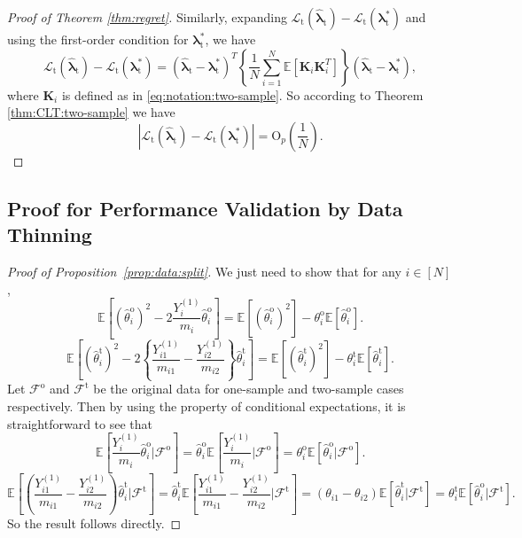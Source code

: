 \documentclass[12pt,letterpaper]{article}
\begin{document}
\begin{proof}[Proof of Theorem \ref{thm:regret}]
Similarly, expanding $\mathcal{L}_{\mathrm{t}}(\hat{\boldsymbol{\lambda}}_{\mathrm{t}})-\mathcal{L}_{\mathrm{t}}(\boldsymbol{\lambda}_{\mathrm{t}}^*)$ and using the first-order condition for $\boldsymbol{\lambda}_{\mathrm{t}}^*$, we have  
\begin{equation}\label{eq:loss:regret:two-sample}
\mathcal{L}_{\mathrm{t}}(\hat{\boldsymbol{\lambda}}_{\mathrm{t}})-\mathcal{L}_{\mathrm{t}}(\boldsymbol{\lambda}_{\mathrm{t}}^*)=(\hat{\boldsymbol{\lambda}}_{\mathrm{t}}-\boldsymbol{\lambda}_{\mathrm{t}}^*)^T\left\{\frac{1}{N}\sum_{i=1}^N\mathbb{E}\left[\mathbf{K}_i\mathbf{K}_i^T\right]\right\}(\hat{\boldsymbol{\lambda}}_{\mathrm{t}}-\boldsymbol{\lambda}_{\mathrm{t}}^*),
\end{equation}
where $\mathbf{K}_i$ is defined as in \eqref{eq:notation:two-sample}. So according to Theorem \ref{thm:CLT:two-sample} we have 
$$\left|\mathcal{L}_{\mathrm{t}}(\hat{\boldsymbol{\lambda}}_{\mathrm{t}})-\mathcal{L}_{\mathrm{t}}(\boldsymbol{\lambda}_{\mathrm{t}}^*)\right|=\mathrm{O}_{p}\left(\frac{1}{N}\right).$$
\end{proof}

\subsection{Proof for Performance Validation by Data Thinning}
\begin{proof}[Proof of Proposition~\ref{prop:data:split}]
We just need to show that for any $i\in[N]$, 
$$\mathbb{E}\left[\left(\hat{\theta}_i^{\mathrm{o}}\right)^2-2\frac{Y_i^{(1)}}{m_i}\hat{\theta}_i^{\mathrm{o}}\right]=\mathbb{E}\left[\left(\hat{\theta}_i^{\mathrm{o}}\right)^2\right]-\theta_i^{\mathrm{o}}\mathbb{E}\left[\hat{\theta}_i^{\mathrm{o}}\right].$$
$$\mathbb{E}\left[\left(\hat{\theta}_i^{\mathrm{t}}\right)^2-2\left\{\frac{Y_{i1}^{(1)}}{m_{i1}}-\frac{Y_{i2}^{(1)}}{m_{i2}}\right\}\hat{\theta}_i^{\mathrm{t}}\right]=\mathbb{E}\left[\left(\hat{\theta}_i^{\mathrm{t}}\right)^2\right]-\theta_i^{\mathrm{t}}\mathbb{E}\left[\hat{\theta}_i^{\mathrm{t}}\right].$$
Let $\mathcal{F}^{\mathrm{o}}$ and $\mathcal{F}^{\mathrm{t}}$ be the original data for one-sample and two-sample cases respectively. Then by using the property of conditional expectations, it is straightforward to see that 
$$\mathbb{E}\left[\frac{Y_i^{(1)}}{m_i}\hat{\theta}_i^{\mathrm{o}}\big|\mathcal{F}^{\mathrm{o}}\right]=\hat{\theta}_i^{\mathrm{o}}\mathbb{E}\left[\frac{Y_i^{(1)}}{m_i}\big|\mathcal{F}^{\mathrm{o}}\right]=\theta_i^{\mathrm{o}}\mathbb{E}\left[\hat{\theta}_i^{\mathrm{o}}\big|\mathcal{F}^{\mathrm{o}}\right].$$
$$\mathbb{E}\left[\left(\frac{Y_{i1}^{(1)}}{m_{i1}}-\frac{Y_{i2}^{(1)}}{m_{i2}}\right)\hat{\theta}_i^{\mathrm{t}}\big|\mathcal{F}^{\mathrm{t}}\right]=\hat{\theta}_i^{\mathrm{t}}\mathbb{E}\left[\frac{Y_{i1}^{(1)}}{m_{i1}}-\frac{Y_{i2}^{(1)}}{m_{i2}}\big|\mathcal{F}^{\mathrm{t}}\right]=\left(\theta_{i1}-\theta_{i2}\right)\mathbb{E}\left[\hat{\theta}_i^{\mathrm{t}}\big|\mathcal{F}^{\mathrm{t}}\right]=\theta_i^{\mathrm{t}}\mathbb{E}\left[\hat{\theta}_i^{\mathrm{o}}\big|\mathcal{F}^{\mathrm{t}}\right].$$
So the result follows directly. 
\end{proof}
\end{document}

